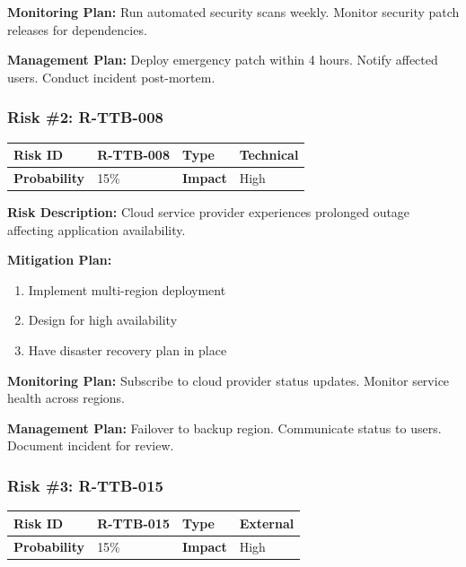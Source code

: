\textbf{Monitoring Plan:} Run automated security scans weekly. Monitor security patch releases for dependencies.

\textbf{Management Plan:} Deploy emergency patch within 4 hours. Notify affected users. Conduct incident post-mortem.

\subsubsection{Risk \#2: R-TTB-008}

\begin{table}[h]
\small
\begin{tabular}{|p{3cm}|p{3cm}|p{3cm}|p{3cm}|}
\hline
\textbf{Risk ID} & R-TTB-008 & \textbf{Type} & Technical \\
\hline
\textbf{Probability} & 15\% & \textbf{Impact} & High \\
\hline
\end{tabular}
\end{table}

\textbf{Risk Description:} Cloud service provider experiences prolonged outage affecting application availability.

\textbf{Mitigation Plan:}
\begin{enumerate}[leftmargin=*]
    \item Implement multi-region deployment
    \item Design for high availability
    \item Have disaster recovery plan in place
\end{enumerate}

\textbf{Monitoring Plan:} Subscribe to cloud provider status updates. Monitor service health across regions.

\textbf{Management Plan:} Failover to backup region. Communicate status to users. Document incident for review.

\subsubsection{Risk \#3: R-TTB-015}

\begin{table}[h]
\small
\begin{tabular}{|p{3cm}|p{3cm}|p{3cm}|p{3cm}|}
\hline
\textbf{Risk ID} & R-TTB-015 & \textbf{Type} & External \\
\hline
\textbf{Probability} & 15\% & \textbf{Impact} & High \\
\hline
\end{tabular}
\end{table}

